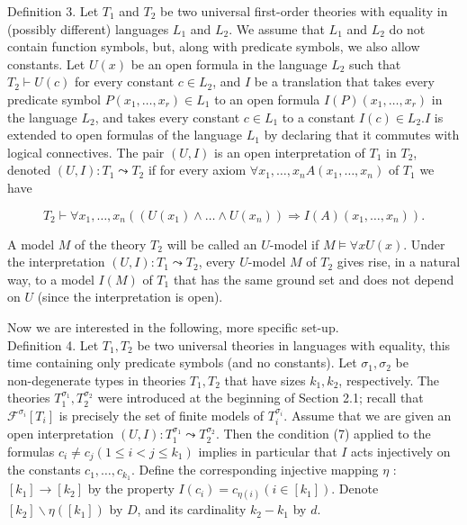 \documentclass[10pt]{article}
\begin{document}
Definition 3. Let $T_{1}$ and $T_{2}$ be two universal first-order theories with equality in (possibly different) languages $L_{1}$ and $L_{2}$. We assume that $L_{1}$ and $L_{2}$ do not contain function symbols, but, along with predicate symbols, we also allow constants. Let $U(x)$ be an open formula in the language $L_{2}$ such that $T_{2} \vdash U(c)$ for every constant $c \in L_{2}$, and $I$ be a translation that takes every predicate symbol $P\left(x_{1}, \ldots, x_{r}\right) \in L_{1}$ to an open formula $I(P)\left(x_{1}, \ldots, x_{r}\right)$ in the language $L_{2}$, and takes every constant $c \in L_{1}$ to a constant $I(c) \in L_{2} . I$ is extended to open formulas of the language $L_{1}$ by declaring that it commutes with logical connectives. The pair $(U, I)$ is an open interpretation of $T_{1}$ in $T_{2}$, denoted $(U, I): T_{1} \leadsto T_{2}$ if for every axiom $\forall x_{1}, \ldots, x_{n} A\left(x_{1}, \ldots, x_{n}\right)$ of $T_{1}$ we have


\begin{equation*}
T_{2} \vdash \forall x_{1}, \ldots, x_{n}\left(\left(U\left(x_{1}\right) \wedge \ldots \wedge U\left(x_{n}\right)\right) \Longrightarrow I(A)\left(x_{1}, \ldots, x_{n}\right)\right) . \tag{7}
\end{equation*}


A model $M$ of the theory $T_{2}$ will be called an $U$-model if $M \models \forall x U(x)$. Under the interpretation $(U, I): T_{1} \leadsto T_{2}$, every $U$-model $M$ of $T_{2}$ gives rise, in a natural way, to a model $I(M)$ of $T_{1}$ that has the same ground set and does not depend on $U$ (since the interpretation is open).

Now we are interested in the following, more specific set-up.\\
Definition 4. Let $T_{1}, T_{2}$ be two universal theories in languages with equality, this time containing only predicate symbols (and no constants). Let $\sigma_{1}, \sigma_{2}$ be\\
non-degenerate types in theories $T_{1}, T_{2}$ that have sizes $k_{1}, k_{2}$, respectively. The theories $T_{1}^{\sigma_{1}}, T_{2}^{\sigma_{2}}$ were introduced at the beginning of Section 2.1; recall that $\mathcal{F}^{\sigma_{i}}\left[T_{i}\right]$ is precisely the set of finite models of $T_{i}^{\sigma_{i}}$. Assume that we are given an open interpretation $(U, I): T_{1}^{\sigma_{1}} \leadsto T_{2}^{\sigma_{2}}$. Then the condition (7) applied to the formulas $c_{i} \neq c_{j}\left(1 \leq i<j \leq k_{1}\right)$ implies in particular that $I$ acts injectively on the constants $c_{1}, \ldots, c_{k_{1}}$. Define the corresponding injective mapping $\eta$ : $\left[k_{1}\right] \longrightarrow\left[k_{2}\right]$ by the property $I\left(c_{i}\right)=c_{\eta(i)}\left(i \in\left[k_{1}\right]\right)$. Denote $\left[k_{2}\right] \backslash \eta\left(\left[k_{1}\right]\right)$ by $D$, and its cardinality $k_{2}-k_{1}$ by $d$.
\end{document}
